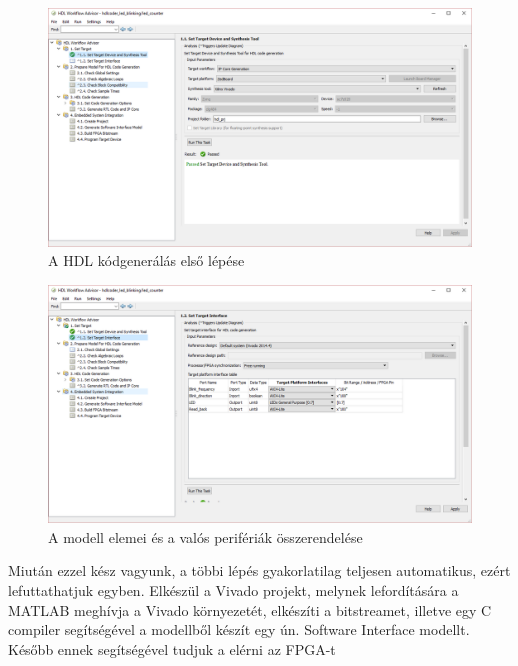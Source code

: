 \begin{figure}[!ht]
	\centering
	\includegraphics[width = \textwidth]{figures/hdlworkflow.PNG}
	\caption{A HDL kódgenerálás első lépése} 
	\label{fig:hdlgen}
\end{figure}


\begin{figure}[!ht]
	\centering
	\includegraphics[width = \textwidth]{figures/hdl_2.PNG}
	\caption{A modell elemei és a valós perifériák összerendelése} 
	\label{fig:hdlgen_2}
\end{figure}

Miután ezzel kész vagyunk, a többi lépés gyakorlatilag teljesen automatikus, ezért lefuttathatjuk egyben. Elkészül a Vivado projekt, melynek lefordítására a MATLAB meghívja a Vivado környezetét, elkészíti a bitstreamet, illetve egy C compiler segítségével a modellből készít egy ún. Software Interface modellt. Később ennek segítségével tudjuk a elérni az FPGA-t


